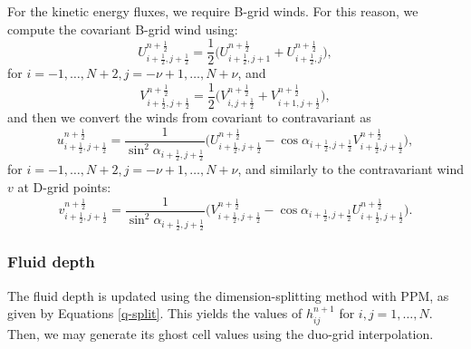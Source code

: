 For the kinetic energy fluxes, we require B-grid winds. 
For this reason, we compute the covariant B-grid wind using:
\begin{equation}
	\label{bgrid-U}
	U_{i+\frac{1}{2},j+\frac{1}{2}}^{n+\frac{1}{2}}	= 
	\frac{1}{2}\big(U_{i+\frac{1}{2},j+1}^{n+\frac{1}{2}} + U_{i+\frac{1}{2},j}^{n+\frac{1}{2}} \big),
\end{equation}
for $i=-1,\ldots,N+2, j=-\nu+1,\ldots,N+\nu$, and
\begin{equation}
	\label{bgrid-V}
	V_{i+\frac{1}{2},j+\frac{1}{2}}^{n+\frac{1}{2}}	= 
	\frac{1}{2}\big(V_{i,j+\frac{1}{2}}^{n+\frac{1}{2}} + V_{i+1,j+\frac{1}{2}}^{n+\frac{1}{2}} \big),
\end{equation}
and then we convert the winds from covariant to contravariant as
\begin{equation}
	\label{bgrid-UU}
	u_{i+\frac{1}{2},j+\frac{1}{2}}^{n+\frac{1}{2}}	= \frac{1}{\sin^2{\alpha_{i+\frac{1}{2},j+\frac{1}{2}}}}\bigg(
	U_{i+\frac{1}{2},j+\frac{1}{2}}^{n+\frac{1}{2}} - \cos{\alpha_{i+\frac{1}{2},j+\frac{1}{2}}}V_{i+\frac{1}{2},j+\frac{1}{2}}^{n+\frac{1}{2}}\bigg),
\end{equation}
for $i=-1,\ldots,N+2, j=-\nu+1,\ldots,N+\nu$, and similarly to the contravariant wind $v$ at D-grid points:
\begin{equation}
	\label{bgrid-VV}
	v_{i+\frac{1}{2},j+\frac{1}{2}}^{n+\frac{1}{2}}	= \frac{1}{\sin^2{\alpha_{i+\frac{1}{2},j+\frac{1}{2}}}}\bigg(
	V_{i+\frac{1}{2},j+\frac{1}{2}}^{n+\frac{1}{2}} - \cos{\alpha_{i+\frac{1}{2},j+\frac{1}{2}}}U_{i+\frac{1}{2},j+\frac{1}{2}}^{n+\frac{1}{2}}\bigg).
\end{equation}

\subsubsection{Fluid depth}
The fluid depth is updated using the dimension-splitting method with PPM, as given by Equations \eqref{q-split}. 
This yields the values of $h_{ij}^{n+1}$ for $i,j=1, \ldots, N$.
Then, we may generate its ghost cell values using the duo-grid interpolation.

